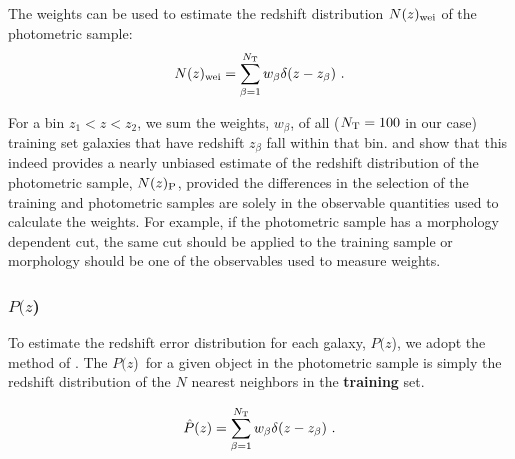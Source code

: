 \documentclass[12pt,preprint]{aastex}
\newcommand{\pofz}{$P(z$)}
\newcommand{\nwei}{N(z)_{\rm wei}}
\begin{document}
The weights can be used to estimate the redshift distribution $\nwei$ of the
photometric sample:
\begin{equation}  
\nwei = \sum_{\beta=1}^{N_{\rm T}} w_\beta \delta(z-z_\beta)~.
\label{eqn:Nzest}
\end{equation}

\noindent For a bin $z_1 < z < z_2$, we sum the weights, $w_{\beta}$, of all 
($N_{\rm T}=100$ in our case) training set galaxies that have redshift $z_{\beta}$ 
fall within that bin. \cite{LimaPhotoz08} and
\cite{CunhaPhotoz09} show that this indeed provides a nearly unbiased estimate
of the redshift distribution of the photometric sample, $N(z)_{\rm P}$,
provided the differences in the selection of the training and photometric
samples are solely in the observable quantities used to calculate the weights.
For example, if the photometric sample has a morphology dependent cut,
the same cut should be applied to the training sample or morphology should be 
one of the observables used to measure weights.


\subsubsection{\pofz}

To estimate the redshift error distribution for each galaxy, \pofz,
we adopt the method of \cite{CunhaPhotoz09}. The \pofz\ for a given object in the
photometric sample is simply the redshift distribution of the $N$
nearest neighbors in the {\bf training} set.

\begin{equation}
\hat{P}(z) = \sum_{\beta=1}^{N_{\rm T}} w_\beta \delta(z-z_\beta)~.
\label{eqn:pzest}
\end{equation}
\end{document}
